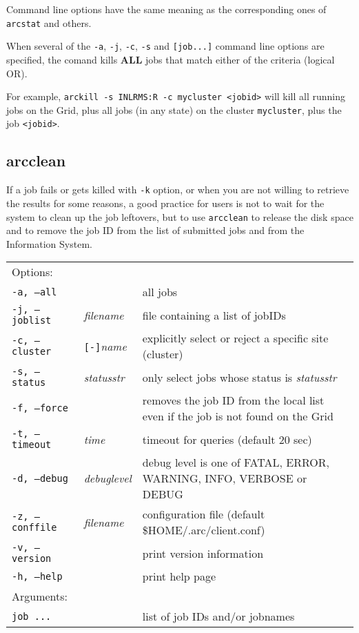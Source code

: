 Command line options have the same meaning as the corresponding ones of \verb#arcstat# and others.

\begin{framed}
  When several of the \verb#-a#,  \verb#-j#, \verb#-c#, \verb#-s# and \verb#[job...]#
  command line options are specified, the comand kills \textbf{ALL} jobs that
  match either of the criteria (logical OR).

  For example, \verb#arckill -s INLRMS:R -c mycluster <jobid># will kill all running
  jobs on the Grid, plus all jobs (in any state) on the cluster \verb#mycluster#, plus the job \verb#<jobid>#.
\end{framed}


\subsection{arcclean}
\label{sec:arcclean}

If a job fails or gets killed with \verb#-k# option, or when you are not willing
to retrieve the results for some reasons, a good practice for users is not to wait
for the system to clean up the job leftovers, but to use
\texttt{arcclean} to release the disk
space and to remove the job ID from the list of submitted jobs and from the Information System.

\hspace*{0.5cm}
\begin{shaded}
\end{shaded}
\begin{longtable}{llp{8cm}}
   Options:&&\\
   \texttt{-a, --all}& & all jobs\\
   \texttt{-j, --joblist}& \textit{filename} & file containing a list of jobIDs\\
   \texttt{-c, --cluster}&\verb#[-]#\textit{name}&explicitly select or reject a specific site (cluster)\\
   \texttt{-s, --status}& \textit{statusstr} &only select jobs whose status is \textit{statusstr}\\
   \texttt{-f, --force} & & removes the job ID from the local list even if the job is not found on the Grid\\
   \texttt{-t, --timeout}& \textit{time} & timeout for queries (default 20 sec)\\
   \texttt{-d, --debug}& \textit{debuglevel}&debug level is one of  FATAL, ERROR, WARNING, INFO, VERBOSE or DEBUG\\
   \texttt{-z, --conffile}&\textit{filename}& configuration file (default {\$}HOME/.arc/client.conf)\\
   \texttt{-v, --version}& & print version information\\
   \texttt{-h, --help}& & print help page\\
   Arguments:&&\\
   \texttt{job ...} && list of job IDs and/or jobnames\\
\end{longtable}

